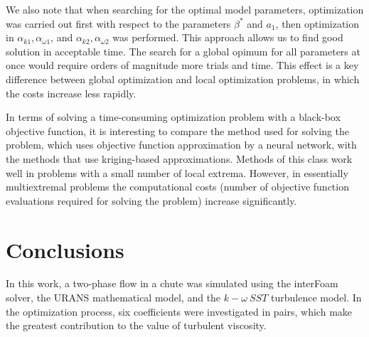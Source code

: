 \documentclass[mathematics,article,submit,pdftex,moreauthors]{Definitions/mdpi}
\begin{document}
We also note that when searching for the optimal model parameters, optimization was carried out first with respect to the parameters $\beta^*$ and $a_1$, then optimization in $\alpha_{k1}, \alpha_{\omega1}$, and $\alpha_{k2}, \alpha_{\omega2}$ was performed. This approach allows us to find good solution in acceptable time.
The search for a global opimum for all parameters at once would require orders of magnitude more trials and time.
This effect is a key difference between global optimization and local optimization problems, in which the costs increase less rapidly.

In terms of solving a time-consuming optimization problem with a black-box objective function, it is interesting to compare the method used for solving the problem, which uses objective function approximation by a neural network, with the methods that use kriging-based approximations.
Methods of this class work well in problems with a small number of local extrema.
However, in essentially multiextremal problems the computational costs (number of objective function evaluations required for solving the problem) increase significantly.


\section{Conclusions}

In this work, a two-phase flow in a chute was simulated using the interFoam solver, the URANS mathematical model, and the $k-\omega\ SST$ turbulence model. In the optimization process, six coefficients were investigated in pairs, which make the greatest contribution to the value of turbulent viscosity.
\end{document}
